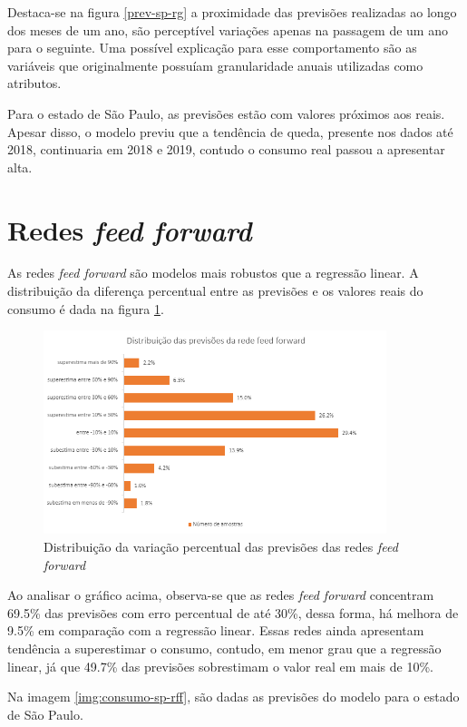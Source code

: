 Destaca-se na figura \ref{prev-sp-rg} a proximidade das previsões realizadas 
ao longo dos meses de um ano, são perceptível variações apenas na passagem de um 
ano para o seguinte. Uma possível explicação para esse comportamento são as 
variáveis que originalmente possuíam granularidade anuais utilizadas como atributos.

Para o estado de São Paulo, as previsões estão com valores próximos aos
reais. Apesar disso, o modelo previu que a tendência de queda, presente
nos dados até 2018, continuaria em 2018 e 2019, contudo o consumo real passou 
a apresentar alta.

\section{Redes \textit{feed forward}}

As redes \textit{feed forward} são modelos mais robustos que a regressão linear.
A distribuição da diferença percentual entre as previsões e os valores reais 
do consumo é dada na figura \ref{img:erro-perc-rff}.

\begin{figure}[H]
    \centering
    \includegraphics[width=10cm]{../figuras/graficos/mlp/erro-perc-mlp.png}
    \caption{Distribuição da variação percentual das previsões das redes \textit{feed forward}}
    \label{img:erro-perc-rff}
\end{figure}

Ao analisar o gráfico acima, observa-se que as redes \textit{feed forward}
concentram 69.5\% das previsões com erro percentual de até 30\%, dessa forma, 
há melhora de 9.5\% em comparação com a regressão linear. Essas redes ainda 
apresentam tendência a superestimar o consumo, contudo, em menor grau que 
a regressão linear, já que 49.7\% das previsões sobrestimam  o valor real 
em mais de 10\%.

Na imagem \ref{img:consumo-sp-rff}, são dadas as previsões do modelo para o estado 
de São Paulo.

